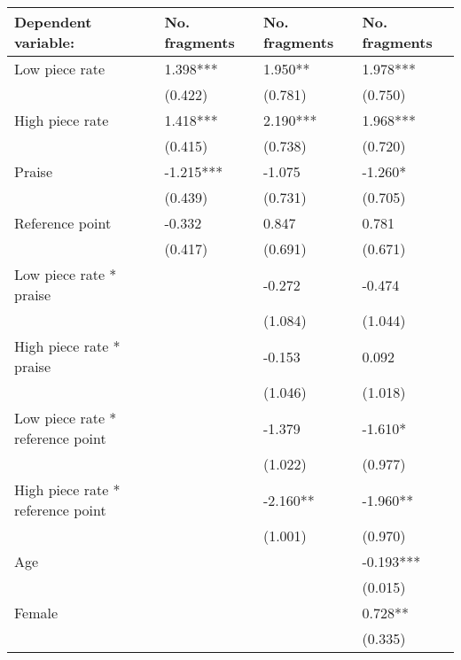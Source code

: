 \begin{tabular}{llll}
\toprule
Dependent variable: & No. fragments & No. fragments & No. fragments \\
\midrule
Low piece rate                    &      1.398*** &       1.950** &      1.978*** \\
                                  &       (0.422) &       (0.781) &       (0.750) \\
High piece rate                   &      1.418*** &      2.190*** &      1.968*** \\
                                  &       (0.415) &       (0.738) &       (0.720) \\
Praise                            &     -1.215*** &        -1.075 &       -1.260* \\
                                  &       (0.439) &       (0.731) &       (0.705) \\
Reference point                   &        -0.332 &         0.847 &         0.781 \\
                                  &       (0.417) &       (0.691) &       (0.671) \\
Low piece rate * praise           &               &        -0.272 &        -0.474 \\
                                  &               &       (1.084) &       (1.044) \\
High piece rate * praise          &               &        -0.153 &         0.092 \\
                                  &               &       (1.046) &       (1.018) \\
Low piece rate * reference point  &               &        -1.379 &       -1.610* \\
                                  &               &       (1.022) &       (0.977) \\
High piece rate * reference point &               &      -2.160** &      -1.960** \\
                                  &               &       (1.001) &       (0.970) \\
Age                               &               &               &     -0.193*** \\
                                  &               &               &       (0.015) \\
Female                            &               &               &       0.728** \\
                                  &               &               &       (0.335) \\

\end{tabular}
